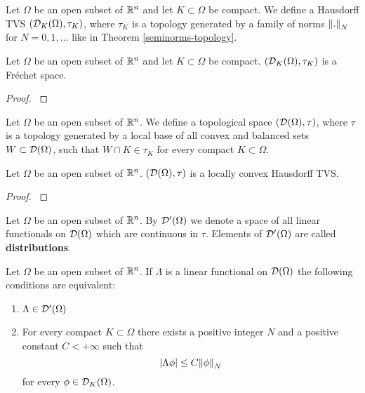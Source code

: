 \documentclass[main.tex]{subfiles}
\begin{document}
\begin{definition}
Let $\Omega$ be an open subset of $\mathbb{R}^n$ and let $K\subset \Omega$ be compact. 
We define a Hausdorff TVS $(\mathcal{D}_K(\Omega),\tau_K)$, where $\tau_K$ is a topology generated by a family of norms $\norm{.}_N$ for $N=0,1, \dots$ like in Theorem \ref{seminorms-topology}.
\end{definition}

\begin{corollary}
Let $\Omega$ be an open subset of $\mathbb{R}^n$ and let $K\subset \Omega$ be compact. $(\mathcal{D}_K(\Omega),\tau_K)$ is a Fr\'echet space.
\end{corollary}
\begin{proof}
\cite[See][1.46]{rudin1991}
\end{proof}
\begin{definition}
Let $\Omega$ be an open subset of $\mathbb{R}^n$.
We define a topological space $(\mathcal{D}(\Omega), \tau)$, where $\tau$ is a topology generated by a local base of all convex and balanced sets $W\subset \mathcal{D}(\Omega)$, such that $W\cap K \in \tau_K$ for every compact $K\subset \Omega$. 
\end{definition}
\begin{theorem}
Let $\Omega$ be an open subset of $\mathbb{R}^n$.
$(\mathcal{D}(\Omega), \tau)$ is a locally convex Hausdorff TVS. 
\end{theorem}
\begin{proof}
\cite[See][6.4]{rudin1991}
\end{proof}
\begin{definition}
Let $\Omega$ be an open subset of $\mathbb{R}^n$.
By $\mathcal{D}'(\Omega)$ we denote a space of all linear functionals on $\mathcal{D}(\Omega)$ which are continuous in $\tau$. Elements of $\mathcal{D}'(\Omega)$ are called \textbf{distributions}.
\end{definition}
\begin{theorem}
\label{distribution-characteristic}
Let $\Omega$ be an open subset of $\mathbb{R}^n$.
If $\Lambda$ is a linear functional on $\mathcal{D}(\Omega)$ the following conditions are equivalent:
\begin{enumerate}
\item $\Lambda\in\mathcal{D}'(\Omega)$
\item For every compact $K\subset\Omega$ there exists a positive integer $N$ and a positive constant $C<+\infty$ such that
\begin{equation}
|\Lambda\phi| \leq C\norm{\phi}_N
\end{equation}
for every $\phi\in\mathcal{D}_K(\Omega)$.
\end{enumerate} 
\end{theorem}
\end{document}
